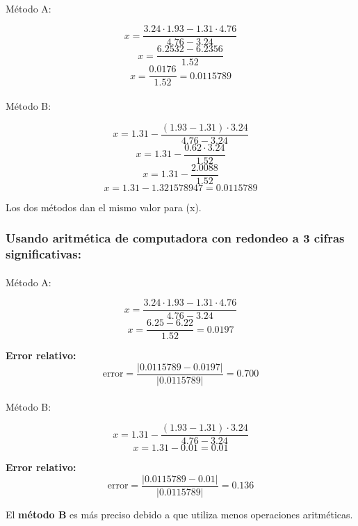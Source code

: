 \documentclass[
  letterpaper,
  DIV=11,
  numbers=noendperiod]{scrartcl}
\makeatletter
\let\oldparagraph\paragraph
\renewcommand{\paragraph}{
    \@ifstar
      \xxxParagraphStar
      \xxxParagraphNoStar
  }
\newcommand{\xxxParagraphStar}[1]{\oldparagraph*{#1}\mbox{}}
\newcommand{\xxxParagraphNoStar}[1]{\oldparagraph{#1}\mbox{}}
\makeatother
\begin{document}
\paragraph{Método A:}\label{muxe9todo-a-1}

\[
x = \frac{3.24 \cdot 1.93 - 1.31 \cdot 4.76}{4.76 - 3.24}
\] \[
x = \frac{6.2532 - 6.2356}{1.52}
\] \[
x = \frac{0.0176}{1.52} = 0.0115789
\]

\paragraph{Método B:}\label{muxe9todo-b-1}

\[
x = 1.31 - \frac{(1.93 - 1.31) \cdot 3.24}{4.76 - 3.24}
\] \[
x = 1.31 - \frac{0.62 \cdot 3.24}{1.52}
\] \[
x = 1.31 - \frac{2.0088}{1.52}
\] \[
x = 1.31 - 1.321578947 = 0.0115789
\]

Los dos métodos dan el mismo valor para (x).

\subsubsection{Usando aritmética de computadora con redondeo a 3 cifras
significativas:}\label{usando-aritmuxe9tica-de-computadora-con-redondeo-a-3-cifras-significativas}

\paragraph{Método A:}\label{muxe9todo-a-2}

\[
x = \frac{3.24 \cdot 1.93 - 1.31 \cdot 4.76}{4.76 - 3.24}
\] \[
x = \frac{6.25 - 6.22}{1.52} = 0.0197
\]

\textbf{Error relativo:}\\
\[
\text{error} = \frac{|0.0115789 - 0.0197|}{|0.0115789|} = 0.700
\]

\paragraph{Método B:}\label{muxe9todo-b-2}

\[
x = 1.31 - \frac{(1.93 - 1.31) \cdot 3.24}{4.76 - 3.24}
\] \[
x = 1.31 - 0.01 = 0.01
\]

\textbf{Error relativo:}\\
\[
\text{error} = \frac{|0.0115789 - 0.01|}{|0.0115789|} = 0.136
\]

El \textbf{método B} es más preciso debido a que utiliza menos
operaciones aritméticas.
\end{document}
